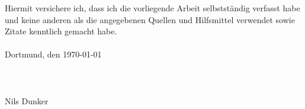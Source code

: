 \thispagestyle{myheadings}

\cleardoublepage
\normalsize
Hiermit versichere ich, dass ich die vorliegende Arbeit selbstständig verfasst habe und keine anderen als die angegebenen Quellen und Hilfsmittel verwendet sowie Zitate kenntlich gemacht habe.\\\\
Dortmund, den \today \\\\\\\\
Nils Dunker
